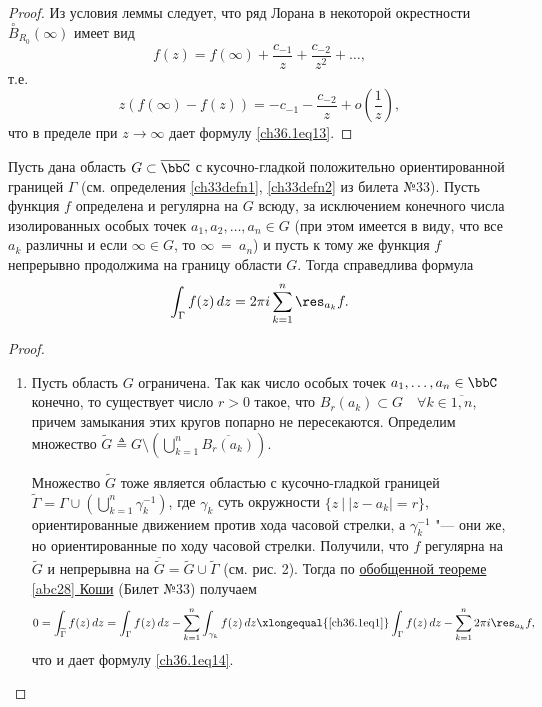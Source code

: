 \begin{proof}
Из условия леммы следует, что ряд Лорана в некоторой окрестности $\overset{\circ}{B}_{R_0}(\infty)$ имеет вид
$$
f(z) = f(\infty) + \frac{c_{-1}}{z} + \frac{c_{-2}}{z^2} + \ldots,
$$
т.е.
$$
z(f(\infty) - f(z)) = -c_{-1} - \frac{c_{-2}}{z} + o\left(\frac{1}{z}\right),
$$
что в пределе при $z \to \infty$ дает формулу \eqref{ch36.1eq13}.	

\end{proof}

\begin{leftbar}
\begin{thm}  \label{ch36.1T1}
Пусть дана область $G \subset \overline{\bbC}$ с кусочно-гладкой положительно ориентированной границей $\Gamma$ (см. определения \ref{ch33defn1}, \ref{ch33defn2} из билета №33). Пусть функция $f$ определена и регулярна на $G$ всюду, за исключением конечного числа изолированных особых точек $a_1,a_2,\ldots,a_n \in G$ (при этом имеется в виду, что все $a_k$ различны и если $\infty \in G$, то $\infty\ =\ a_n$) и пусть к тому же функция $f$ непрерывно продолжима на границу области $G$. Тогда справедлива формула
\begin{equation} \label{ch36.1eq14}
\int_\Gamma f(z) \,dz = 2 \pi i \sum_{k = 1}^{n} \res_{a_k} f.
\end{equation}
\end{thm}

\begin{proof}
\begin{enumerate}
\item Пусть область $G$ ограничена. Так как число особых точек $a_1,\ldots,a_n \in \bbC$ конечно, то существует число $r > 0$ такое, что $B_r(a_k) \subset G \quad \forall k \in \overline{1,n}$, причем замыкания этих кругов попарно не пересекаются. Определим множество $\widetilde{G} \triangleq G \setminus \left( \bigcup\limits_{k = 1}^{n} \overline{B_r(a_k)}\right)$.

Множество $\widetilde{G}$ тоже является областью с кусочно-гладкой границей $\widetilde{\Gamma} = \Gamma \cup \left( \bigcup\limits_{k = 1}^{n} \gamma_{k}^{-1} \right)$,	где $\gamma_k$ суть окружности $\{ z \: \big| \: |z - a_k| = r \}$, ориентированные движением против хода часовой стрелки, а $\gamma_{k}^{-1}$ "--- они же, но ориентированные по ходу часовой стрелки. Получили, что $f$ регулярна на $\widetilde{G}$ и непрерывна на $\overline{\widetilde{G}} = \widetilde{G} \cup \widetilde{\Gamma}$ (см. рис. 2). Тогда по \hyperref[abc28]{обобщенной теореме \ref{abc28} Коши} (Билет №33) получаем
$$
0 = \int_{\widetilde{\Gamma}} f(z) \,dz = \int_{\Gamma} f(z) \,dz - \sum_{k = 1}^{n} \int_{\gamma_k} f(z) \,dz \xlongequal{\eqref{ch36.1eq1}} \int_{\Gamma} f(z) \,dz - \sum_{k = 1}^{n} 2\pi i \res_{a_k} f,
$$
что и дает формулу \eqref{ch36.1eq14}.



\end{enumerate}
\end{proof}
\end{leftbar}
